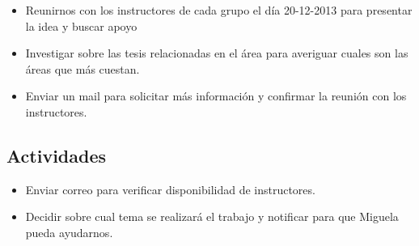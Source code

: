 \begin{itemize}
\itemsep1pt\parskip0pt
\item
  Reunirnos con los instructores de cada grupo el día 20-12-2013 para
  presentar la idea y buscar apoyo
\item
  Investigar sobre las tesis relacionadas en el área para averiguar
  cuales son las áreas que más cuestan.
\item
  Enviar un mail para solicitar más información y confirmar la reunión
  con los instructores.
\end{itemize}

\subsection{Actividades}\label{actividades}

\begin{itemize}
\itemsep1pt\parskip0pt
\item
  Enviar correo para verificar disponibilidad de instructores.
\item
  Decidir sobre cual tema se realizará el trabajo y notificar para que
  Miguela pueda ayudarnos.
\end{itemize}
